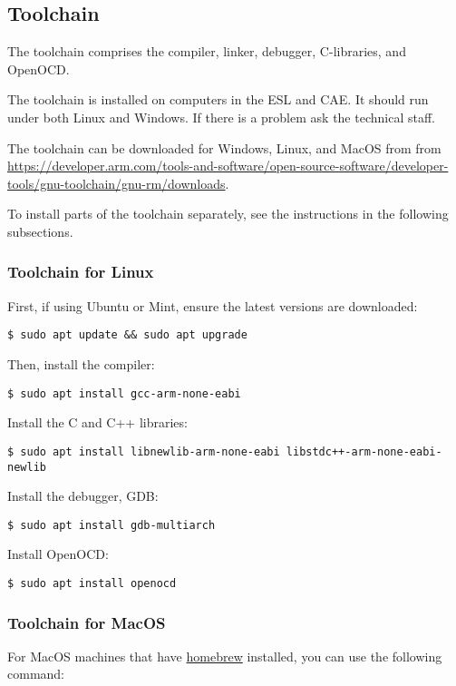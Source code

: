 \subsection{Toolchain}
\label{toolchain}

The toolchain comprises the compiler, linker, debugger, C-libraries,
and OpenOCD.

The toolchain is installed on computers in the ESL and CAE. It should
run under both Linux and Windows.  If there is a problem ask the
technical staff.

The toolchain can be downloaded for Windows, Linux, and MacOS from
from \url{https://developer.arm.com/tools-and-software/open-source-software/developer-tools/gnu-toolchain/gnu-rm/downloads}.

To install parts of the toolchain separately, see the instructions in
the following subsections.


\subsubsection{Toolchain for Linux}

First, if using Ubuntu or Mint, ensure the latest versions are
downloaded:
%
\begin{verbatim}
$ sudo apt update && sudo apt upgrade
\end{verbatim}

Then, install the compiler:
%
\begin{verbatim}
$ sudo apt install gcc-arm-none-eabi
\end{verbatim}

Install the C and C++ libraries:
%
\begin{verbatim}    
$ sudo apt install libnewlib-arm-none-eabi libstdc++-arm-none-eabi-newlib
\end{verbatim}

Install the debugger, GDB:
%
\begin{verbatim}    
$ sudo apt install gdb-multiarch
\end{verbatim}

Install OpenOCD:
%
\begin{verbatim}
$ sudo apt install openocd
\end{verbatim}

\subsubsection{Toolchain for MacOS}

For MacOS machines that have \href{https://brew.sh}{homebrew}
installed, you can use the following command:

